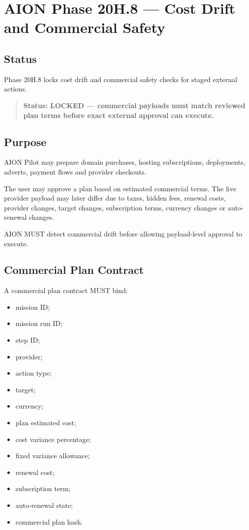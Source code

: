 \section{AION Phase 20H.8 --- Cost Drift and Commercial Safety}
\label{sec:aion-phase20h8-cost-drift-commercial-safety}

\subsection{Status}

Phase 20H.8 locks cost drift and commercial safety checks for staged external actions.

\begin{quote}
\textbf{Status: LOCKED --- commercial payloads must match reviewed plan terms before exact external approval can execute.}
\end{quote}

\subsection{Purpose}

AION Pilot may prepare domain purchases, hosting subscriptions, deployments, adverts, payment flows and provider checkouts.

The user may approve a plan based on estimated commercial terms. The live provider payload may later differ due to taxes, hidden fees, renewal costs, provider changes, target changes, subscription terms, currency changes or auto-renewal changes.

AION MUST detect commercial drift before allowing payload-level approval to execute.

\subsection{Commercial Plan Contract}

A commercial plan contract MUST bind:

\begin{itemize}
  \item mission ID;
  \item mission run ID;
  \item step ID;
  \item provider;
  \item action type;
  \item target;
  \item currency;
  \item plan estimated cost;
  \item cost variance percentage;
  \item fixed variance allowance;
  \item renewal cost;
  \item subscription term;
  \item auto-renewal state;
  \item commercial plan hash.
\end{itemize}

